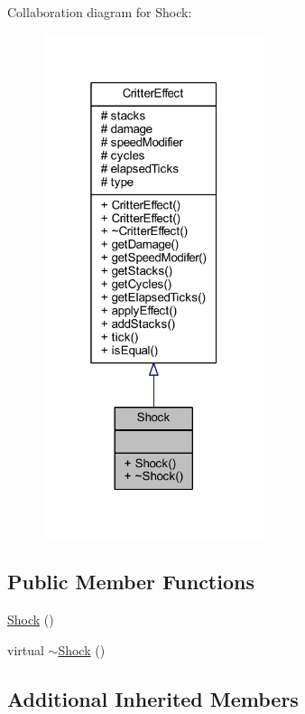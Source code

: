 Collaboration diagram for Shock\+:\nopagebreak
\begin{figure}[H]
\begin{center}
\leavevmode
\includegraphics[width=184pt]{struct_shock__coll__graph}
\end{center}
\end{figure}
\subsection*{Public Member Functions}
\begin{DoxyCompactItemize}
\item 
\hyperlink{struct_shock_afe9b71a9604186d22eb1db2ac710f1b6}{Shock} ()
\item 
virtual \hyperlink{struct_shock_a6917332489870e66f66ceb4e9cb44dd2}{$\sim$\+Shock} ()
\end{DoxyCompactItemize}
\subsection*{Additional Inherited Members}


